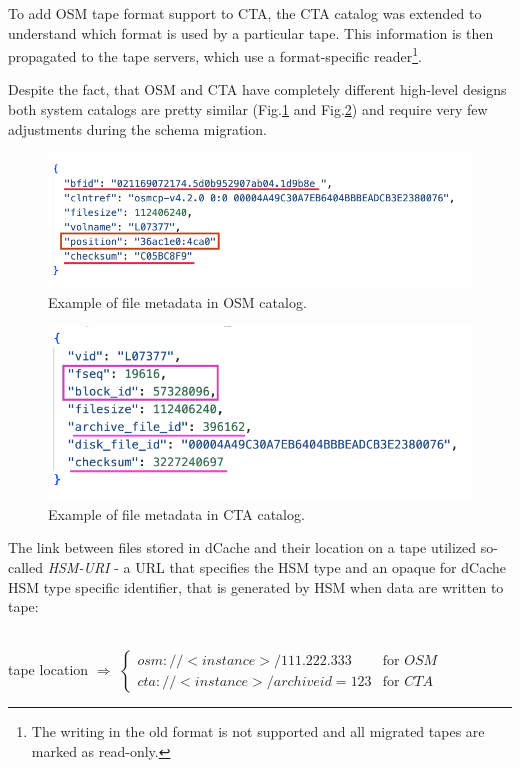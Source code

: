 \documentclass{webofc}
\begin{document}
To add OSM tape format support to CTA, the CTA catalog was extended to understand 
which format is used by a particular tape. This information is then propagated to the tape servers, which use a format-specific reader\footnote{The writing in the old format is not supported and all migrated tapes are marked as read-only.}.

Despite the fact, that OSM and CTA have completely different high-level designs both system catalogs are pretty similar (Fig.\ref{fig:osm_entry_example} and Fig.\ref{fig:cta_entry_example}) and require very few adjustments during the schema migration.

\begin{figure}[h]
    \centering
    \includegraphics[scale=0.60]{osm-schema.png}
    \caption{Example of file metadata in OSM catalog.}
    \label{fig:osm_entry_example}
\end{figure}

\begin{figure}[h]
    \centering
    \includegraphics[scale=0.60]{cta-schema.png}
    \caption{Example of file metadata in CTA catalog.}
    \label{fig:cta_entry_example}
\end{figure}

The link between files stored in dCache and their location on a tape utilized so-called \textit{HSM-URI} - a URL that specifies the HSM type and an opaque for dCache HSM type specific identifier, that is generated by HSM when data are written to tape:

~\\
tape location $\Rightarrow$ $\begin{cases}
    osm://<instance>/111.222.333 &\text{for } OSM \\
    cta://<instance>/archiveid=123 &\text{for } CTA
\end{cases}$
~\\
\end{document}
